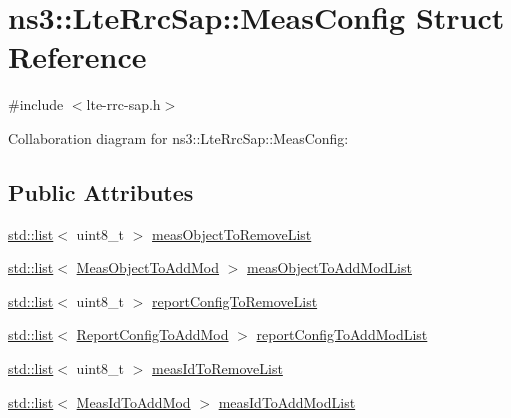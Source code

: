 \hypertarget{structns3_1_1LteRrcSap_1_1MeasConfig}{}\section{ns3\+:\+:Lte\+Rrc\+Sap\+:\+:Meas\+Config Struct Reference}
\label{structns3_1_1LteRrcSap_1_1MeasConfig}


{\ttfamily \#include $<$lte-\/rrc-\/sap.\+h$>$}



Collaboration diagram for ns3\+:\+:Lte\+Rrc\+Sap\+:\+:Meas\+Config\+:
\subsection*{Public Attributes}
\begin{DoxyCompactItemize}
\item 
\hyperlink{openflow-interface_8h_afd9bcfa176617760671b67580f536fa7}{std\+::list}$<$ uint8\+\_\+t $>$ \hyperlink{structns3_1_1LteRrcSap_1_1MeasConfig_a7af3238459db0b504267843da3ab2a4b}{meas\+Object\+To\+Remove\+List}
\item 
\hyperlink{openflow-interface_8h_afd9bcfa176617760671b67580f536fa7}{std\+::list}$<$ \hyperlink{structns3_1_1LteRrcSap_1_1MeasObjectToAddMod}{Meas\+Object\+To\+Add\+Mod} $>$ \hyperlink{structns3_1_1LteRrcSap_1_1MeasConfig_a1e32e45b55111bddfdc608cbff780dc2}{meas\+Object\+To\+Add\+Mod\+List}
\item 
\hyperlink{openflow-interface_8h_afd9bcfa176617760671b67580f536fa7}{std\+::list}$<$ uint8\+\_\+t $>$ \hyperlink{structns3_1_1LteRrcSap_1_1MeasConfig_a1ed9e9ea3b8d2e035f5da7d270cb23d0}{report\+Config\+To\+Remove\+List}
\item 
\hyperlink{openflow-interface_8h_afd9bcfa176617760671b67580f536fa7}{std\+::list}$<$ \hyperlink{structns3_1_1LteRrcSap_1_1ReportConfigToAddMod}{Report\+Config\+To\+Add\+Mod} $>$ \hyperlink{structns3_1_1LteRrcSap_1_1MeasConfig_ac108843a06536367bc3ca19dbd1421da}{report\+Config\+To\+Add\+Mod\+List}
\item 
\hyperlink{openflow-interface_8h_afd9bcfa176617760671b67580f536fa7}{std\+::list}$<$ uint8\+\_\+t $>$ \hyperlink{structns3_1_1LteRrcSap_1_1MeasConfig_a05e09722746ecc1c9dd41a06d4f48e0e}{meas\+Id\+To\+Remove\+List}
\item 
\hyperlink{openflow-interface_8h_afd9bcfa176617760671b67580f536fa7}{std\+::list}$<$ \hyperlink{structns3_1_1LteRrcSap_1_1MeasIdToAddMod}{Meas\+Id\+To\+Add\+Mod} $>$ \hyperlink{structns3_1_1LteRrcSap_1_1MeasConfig_ade3c8b430270fdbc2d1fdd0de3d71b3f}{meas\+Id\+To\+Add\+Mod\+List}

\end{DoxyCompactItemize}
